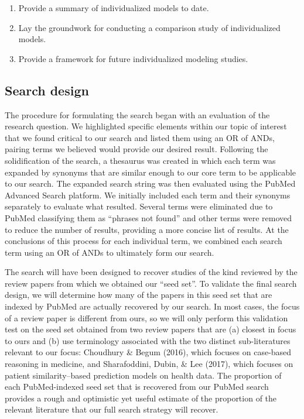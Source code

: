 \documentclass[sn-mathphys,Numbered,pdflatex]{sn-jnl}
\theoremstyle{remark}
\theoremstyle{definition}
\providecommand{\tightlist}{%
  \setlength{\itemsep}{0pt}\setlength{\parskip}{0pt}}
\begin{document}
\begin{enumerate}
\def\labelenumi{\arabic{enumi}.}
\tightlist
\item
  Provide a summary of individualized models to date.
\item
  Lay the groundwork for conducting a comparison study of individualized
  models.
\item
  Provide a framework for future individualized modeling studies.
\end{enumerate}

\subsection*{Search design}\label{search-design}

The procedure for formulating the search began with an evaluation of the
research question. We highlighted specific elements within our topic of
interest that we found critical to our search and listed them using an
OR of ANDs, pairing terms we believed would provide our desired result.
Following the solidification of the search, a thesaurus was created in
which each term was expanded by synonyms that are similar enough to our
core term to be applicable to our search. The expanded search string was
then evaluated using the PubMed Advanced Search platform. We initially
included each term and their synonyms separately to evaluate what
resulted. Several terms were eliminated due to PubMed classifying them
as ``phrases not found'' and other terms were removed to reduce the
number of results, providing a more concise list of results. At the
conclusions of this process for each individual term, we combined each
search term using an OR of ANDs to ultimately form our search.

The search will have been designed to recover studies of the kind
reviewed by the review papers from which we obtained our ``seed set''.
To validate the final search design, we will determine how many of the
papers in this seed set that are indexed by PubMed are actually
recovered by our search. In most cases, the focus of a review paper is
different from ours, so we will only perform this validation test on the
seed set obtained from two review papers that are (a) closest in focus
to ours and (b) use terminology associated with the two distinct
sub-literatures relevant to our focus: Choudhury \& Begum (2016), which
focuses on case-based reasoning in medicine, and Sharafoddini, Dubin, \&
Lee (2017), which focuses on patient similarity--based prediction models
on health data. The proportion of each PubMed-indexed seed set that is
recovered from our PubMed search provides a rough and optimistic yet
useful estimate of the proportion of the relevant literature that our
full search strategy will recover.
\end{document}

